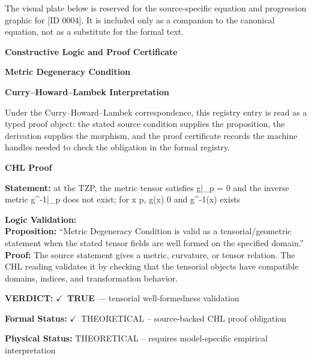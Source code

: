 \begingroup\footnotesize\sloppy
The visual plate below is reserved for the source-specific equation and progression graphic for [ID 0004]. It is included only as a companion to the canonical equation, not as a substitute for the formal text.
\par\endgroup
\ifTZPDarkEdition
{}
\fi

\clearpage
\begingroup\tzpsupportsetup
\noindent\textbf{\fontsize{10.8pt}{12.8pt}\selectfont [ID 0004] Constructive Logic and Proof Certificate}\par
\noindent\textbf{\fontsize{10pt}{12pt}\selectfont Metric Degeneracy Condition}\par
\vspace{0.45em}
\begingroup
\footnotesize
\setlength{\parskip}{0.22em}
\setlength{\parindent}{0pt}
\noindent\textbf{Curry--Howard--Lambek Interpretation}\par
Under the Curry--Howard--Lambek correspondence, this registry entry is read as a typed proof
object: the stated source condition supplies the proposition, the derivation supplies the
morphism, and the proof certificate records the machine handles needed to check the obligation
in the formal registry.

\vspace{0.45em}
\noindent\textbf{CHL Proof}\par
\textbf{Statement:} at the TZP, the metric tensor satisfies  g|\_p = 0 and the inverse metric g\textasciicircum{}-1|\_p
does not exist; for x p,  g(x) 0 and g\textasciicircum{}-1(x) exists

\textbf{Logic Validation:}\\
\textbf{Proposition:} ``Metric Degeneracy Condition is valid as a tensorial/geometric statement when the stated
tensor fields are well formed on the specified domain.''\\
\textbf{Proof:} The source statement gives a metric, curvature, or tensor relation. The CHL reading
validates it by checking that the tensorial objects have compatible domains, indices,
and transformation behavior.

\textbf{VERDICT:} \ensuremath{\checkmark}\ \textbf{TRUE} --- tensorial well-formedness validation

\textbf{Formal Status:} \ensuremath{\checkmark}\ THEORETICAL -- source-backed CHL proof obligation

\textbf{Physical Status:} THEORETICAL -- requires model-specific empirical interpretation
\par\vspace{0.45em}
\par
\ifTZPDarkEdition
{}
\fi
\endgroup
\endgroup

